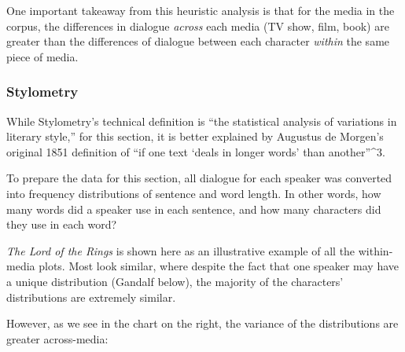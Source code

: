\documentclass{article}
\begin{document}
\begin{titlepage}
One important takeaway from this heuristic analysis is that for the media in the corpus, the differences in dialogue \textit{across} each media (TV show, film, book) are greater than the differences of dialogue between each character \textit{within} the same piece of media.

\subsubsection{Stylometry}

While Stylometry's technical definition is ``the statistical analysis of variations in literary style,'' for this section, it is better explained by Augustus de Morgen's original 1851 definition of ``if one text `deals in longer words' than another''^3.

To prepare the data for this section, all dialogue for each speaker was converted into frequency distributions of sentence and word length. In other words, how many words did a speaker use in each sentence, and how many characters did they use in each word?

\textit{The Lord of the Rings} is shown here as an illustrative example of all the within-media plots. Most look similar, where despite the fact that one speaker may have a unique distribution (Gandalf below), the majority of the characters' distributions are extremely similar.

However, as we see in the chart on the right, the variance of the distributions are greater across-media:


\end{titlepage}
\end{document}
